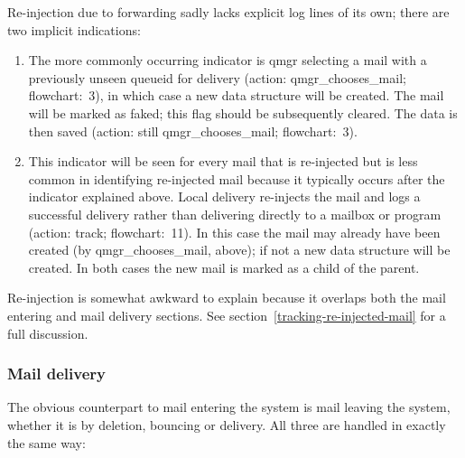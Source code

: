 \documentclass[a4paper,12pt,draft]{article}
\begin{document}
Re-injection due to forwarding sadly lacks explicit log lines of its own;
there are two implicit indications:

\begin{enumerate}

    \item The more commonly occurring indicator is qmgr selecting a mail
        with a previously unseen queueid for delivery (action:
        qmgr\_chooses\_mail; flowchart:~3), in which case a new data
        structure will be created.  The mail will be marked as faked; this
        flag should be subsequently cleared.  The data is then saved
        (action: still qmgr\_chooses\_mail; flowchart:~3).  

    \item This indicator will be seen for every mail that is re-injected
        but is less common in identifying re-injected mail because it
        typically occurs after the indicator explained above.  Local
        delivery re-injects the mail and logs a successful delivery rather
        than delivering directly to a mailbox or program (action: track;
        flowchart:~11).  In this case the mail may already have been
        created (by qmgr\_chooses\_mail, above); if not a new data
        structure will be created.  In both cases the new mail is marked as
        a child of the parent.

\end{enumerate}

Re-injection is somewhat awkward to explain because it overlaps both the
mail entering and mail delivery sections.  See
section~\ref{tracking-re-injected-mail} for a full discussion.

\subsubsection{Mail delivery}

The obvious counterpart to mail entering the system is mail leaving the
system, whether it is by deletion, bouncing or delivery.  All three are
handled in exactly the same way:
\end{document}
